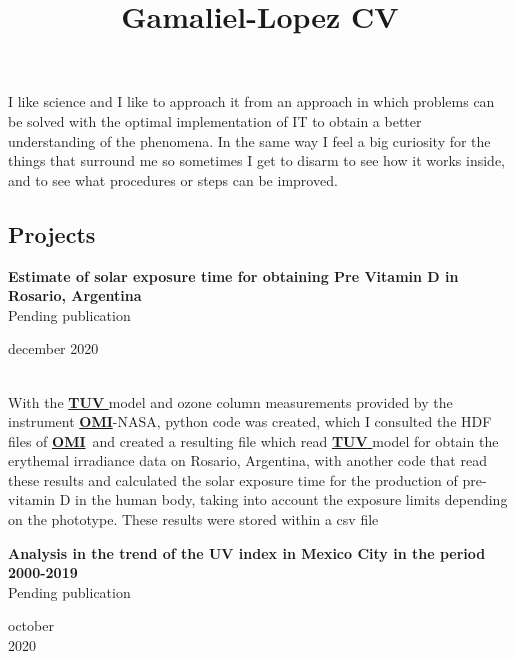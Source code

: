 \documentclass[a3paper]{adcv_color}
\title{Gamaliel-Lopez CV}
\newcommand*{\tuv}{\href{https://www2.acom.ucar.edu/modeling/tropospheric-ultraviolet-and-visible-tuv-radiation-model}{\textbf{TUV }}}
\newcommand*{\omi}{\href{https://aura.gsfc.nasa.gov/omi.html}{\textbf{OMI}}}
\begin{document}
\changefontsizes{14.5pt}
I like science and I like to approach it from an approach in which problems can be solved with the optimal implementation of IT to obtain a better understanding of the phenomena. In the same way I feel a big curiosity for the things that surround me so sometimes I get to disarm 
to see how it works inside, and to see what procedures or steps can be improved.
\begin{multicols}{2}
\section{Projects}

\begin{minipage}{0.8\linewidth}
  \textbf{Estimate of solar exposure time for obtaining Pre Vitamin D in Rosario, Argentina}\\
  Pending publication
\end{minipage}
  \begin{minipage}{0.2\linewidth}
    \begin{flushright}
    \vspace{-0.8cm}
    december 2020
    \end{flushright}
  \end{minipage}\\

  With the \tuv model and ozone column measurements provided by the instrument \omi-NASA, python code was created, which
  I consulted the HDF files of \omi~and created a resulting file which read \tuv model for obtain the erythemal irradiance data
   on Rosario, Argentina, with another code that read these results and calculated the solar exposure time for 
   the production of pre-vitamin D in the human body, taking into account the exposure limits depending on the phototype.
    These results were stored within a csv file
 \\

  \begin{minipage}{0.8\linewidth}
    \textbf{Analysis in the trend of the UV index in Mexico City in the period 2000-2019}\\ 
    Pending publication
  \end{minipage}
    \begin{minipage}{0.2\linewidth}
      \begin{flushright}
        \vspace{-0.7cm}
      october\\ 2020
      \end{flushright}
    \end{minipage}\\
    

\end{multicols}
\end{document}
